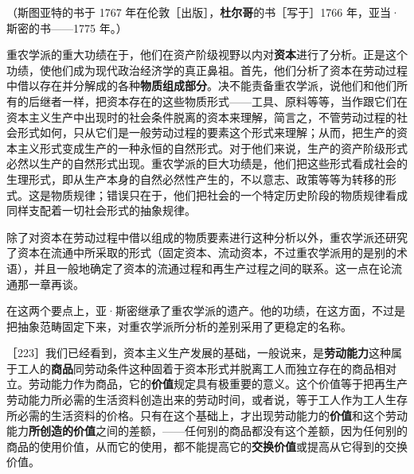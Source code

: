 （斯图亚特的书于 1767 年在伦敦［出版］，\textbf{杜尔哥}的书［写于］1766 年，亚当·斯密的书——1775 年。）



重农学派的重大功绩在于，他们在资产阶级视野以内对\textbf{资本}进行了分析。正是这个功绩，使他们成为现代政治经济学的真正鼻祖。首先，他们分析了资本在劳动过程中借以存在并分解成的各种\textbf{物质组成部分}。决不能责备重农学派，说他们和他们所有的后继者一样，把资本存在的这些物质形式——工具、原料等等，当作跟它们在资本主义生产中出现时的社会条件脱离的资本来理解，简言之，不管劳动过程的社会形式如何，只从它们是一般劳动过程的要素这个形式来理解；从而，把生产的资本主义形式变成生产的一种永恒的自然形式。对于他们来说，生产的资产阶级形式必然以生产的自然形式出现。重农学派的巨大功绩是，他们把这些形式看成社会的生理形式，即从生产本身的自然必然性产生的，不以意志、政策等等为转移的形式。这是物质规律；错误只在于，他们把社会的一个特定历史阶段的物质规律看成同样支配着一切社会形式的抽象规律。

除了对资本在劳动过程中借以组成的物质要素进行这种分析以外，重农学派还研究了资本在流通中所采取的形式（固定资本、流动资本，不过重农学派用的是别的术语），并且一般地确定了资本的流通过程和再生产过程之间的联系。这一点在论流通那一章再谈。

在这两个要点上，亚·斯密继承了重农学派的遗产。他的功绩，在这方面，不过是把抽象范畴固定下来，对重农学派所分析的差别采用了更稳定的名称。

［223］我们已经看到，资本主义生产发展的基础，一般说来，是\textbf{劳动能力}这种属于工人的\textbf{商品}同劳动条件这种固着于资本形式并脱离工人而独立存在的商品相对立。劳动能力作为商品，它的\textbf{价值}规定具有极重要的意义。这个价值等于把再生产劳动能力所必需的生活资料创造出来的劳动时间，或者说，等于工人作为工人生存所必需的生活资料的价格。只有在这个基础上，才出现劳动能力的\textbf{价值}和这个劳动能力\textbf{所创造的价值}之间的差额，——任何别的商品都没有这个差额，因为任何别的商品的使用价值，从而它的使用，都不能提高它的\textbf{交换价值}或提高从它得到的交换价值。

